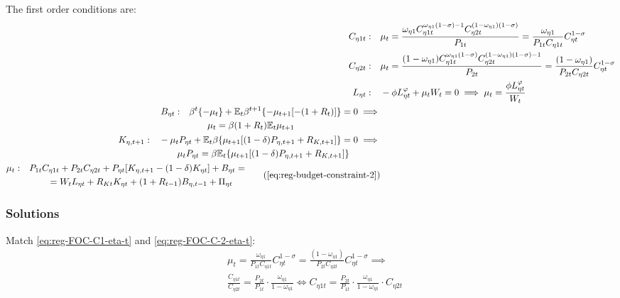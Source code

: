 \documentclass[../thesis.tex]{subfiles}
\begin{document}
The first order conditions are:
\begin{align}
	C_{\eta 1 t}: \quad & \mu_t = \frac{\omega_{\eta 1} C_{\eta 1 t}^{\omega_{\eta 1} (1 -\sigma) -1} C_{\eta 2 t}^{(1 -\omega_{\eta 1})(1 -\sigma)}}{P_{1 t}} = \frac{\omega_{\eta 1}}{P_{1 t} C_{\eta 1 t}} C_{\eta t}^{1 -\sigma} \label{eq:reg-FOC-C1-eta-t} 
	\\
	C_{\eta 2 t}: \quad & \mu_t = \frac{(1 -\omega_{\eta 1}) C_{\eta 1 t}^{\omega_{\eta 1} (1 -\sigma)} C_{\eta 2 t}^{(1 -\omega_{\eta 1})(1 -\sigma)-1}}{P_{2 t}} = \frac{(1 -\omega_{\eta 1})}{P_{2 t} C_{\eta 2 t}} C_{\eta t}^{1 -\sigma} \label{eq:reg-FOC-C-2-eta-t} 
	\\
	L_{\eta t}: \quad & -\phi L_{\eta t}^{\varphi} +\mu_t W_t = 0 \implies \mu_t = \frac{\phi L_{\eta t}^{\varphi}}{W_t} \label{eq:reg-household-FOC-Lt} 
	\\
	\begin{split}
		B_{\eta t}: \quad & \beta^t \{-\mu_t\} + \E \beta^{t+1} \{ -\mu_{t+1} [-(1 + R_{t})] \} = 0 \implies \\ & \qquad \mu_t = \beta (1 + R_{t}) \E{ \mu_{t+1}}
	\end{split} \label{eq:reg-FOC-Bt}
	\\
	\begin{split}
		K_{\eta, t+1}: \quad & -\mu_t P_{\eta t} + \mathbb{E}_t \beta \{ \mu_{t+1} [(1-\delta) P_{\eta, t+1} + R_{K,t+1}] \} = 0 \implies \\ & \qquad \mu_t P_{\eta t} = \beta \mathbb{E}_t \{ \mu_{t+1} [(1-\delta) P_{\eta, t+1} + R_{K,t+1}] \}
	\end{split} \label{eq:reg-household-FOC-Kt} \\
	\begin{split}
		\mu_t: \quad & P_{1 t} C_{\eta 1 t} + P_{2 t} C_{\eta 2 t} + P_{\eta t} [ K_{\eta, t+1} - (1-\delta)K_{\eta t} ] + B_{\eta t} = \\ & \qquad = W_t L_{\eta t} + R_{Kt} K_{\eta t} + (1 + R_{t-1}) B_{\eta,t-1} + \Pi_{\eta t}
	\end{split} \tag{\ref{eq:reg-budget-constraint-2}}
\end{align}

\subsubsection*{Solutions}

Match \ref{eq:reg-FOC-C1-eta-t} and \ref{eq:reg-FOC-C-2-eta-t}:
\begin{align}
	& \mu_t = \frac{\omega_{\eta 1}}{P_{1 t} C_{\eta 1 t}} C_{\eta t}^{1 -\sigma} = \frac{(1 -\omega_{\eta 1})}{P_{2 t} C_{\eta 2 t}} C_{\eta t}^{1 -\sigma} \implies \nonumber \\
	& \frac{C_{\eta 1 t}}{C_{\eta 2 t}} = \frac{P_{2 t}}{P_{1 t}} \cdot \frac{\omega_{\eta 1}}{1 -\omega_{\eta 1}} \iff C_{\eta 1 t} = \frac{P_{2 t}}{P_{1 t}} \cdot \frac{\omega_{\eta 1}}{1 -\omega_{\eta 1}} \cdot C_{\eta 2 t} \label{eq:reg-FOC-C1-C2}
\end{align}
\end{document}
